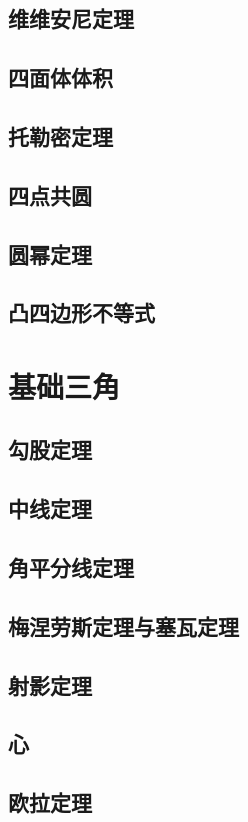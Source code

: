 \documentclass[UTF8]{ctexart}
\begin{document}
\subsection{维维安尼定理}
\subsection{四面体体积}
\subsection{托勒密定理}
\subsection{四点共圆}
\subsection{圆幂定理}
\subsection{凸四边形不等式}


\section{基础三角}

\subsection{勾股定理}
\subsection{中线定理}
\subsection{角平分线定理}
\subsection{梅涅劳斯定理与塞瓦定理}
\subsection{射影定理}
\subsection{心}
\subsection{欧拉定理}
\end{document}

